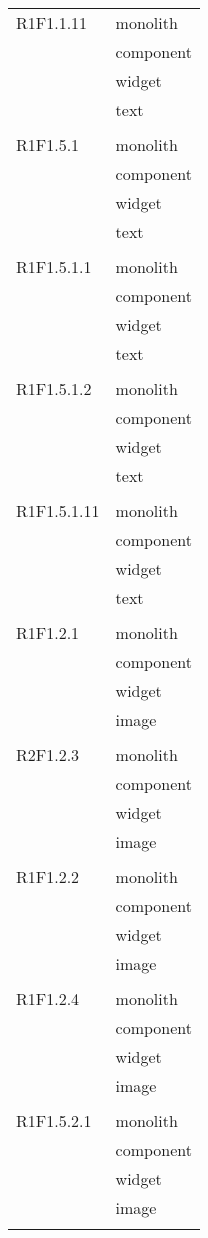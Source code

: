 \begin{center}
\begin{longtable}{|p{7cm}|p{7cm}|}
		R1F1.1.11 & monolith \\ & component \\ & widget \\ & text \\ & \\ \hline
		R1F1.5.1 & monolith \\ & component \\ & widget \\ & text \\ & \\ \hline
		R1F1.5.1.1 & monolith \\ & component \\ & widget \\ & text \\ & \\ \hline
		R1F1.5.1.2 & monolith \\ & component \\ & widget \\ & text \\ & \\ \hline
		R1F1.5.1.11 & monolith \\ & component \\ & widget \\ & text \\ & \\ \hline
		R1F1.2.1 & monolith \\ & component \\ & widget \\ & image \\ & \\ \hline
		R2F1.2.3 & monolith \\ & component \\ & widget \\ & image \\ & \\ \hline
		R1F1.2.2 & monolith \\ & component \\ & widget \\ & image \\ & \\ \hline
		R1F1.2.4 & monolith \\ & component \\ & widget \\ & image \\ & \\ \hline
		R1F1.5.2.1 & monolith \\ & component \\ & widget \\ & image \\ & \\ \hline

\end{longtable}
\end{center}
